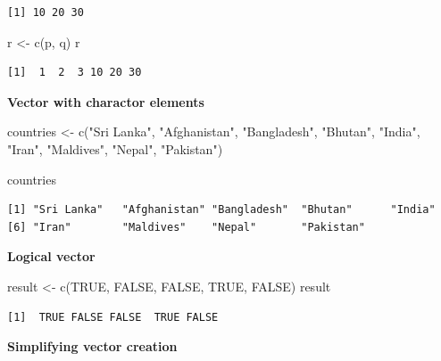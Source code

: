 \documentclass[
  letterpaper,
  DIV=11,
  numbers=noendperiod]{scrreprt}
\newenvironment{Shaded}{\begin{snugshade}}{\end{snugshade}}
\newcommand{\ConstantTok}[1]{\textcolor[rgb]{0.56,0.35,0.01}{#1}}
\newcommand{\FunctionTok}[1]{\textcolor[rgb]{0.28,0.35,0.67}{#1}}
\newcommand{\NormalTok}[1]{\textcolor[rgb]{0.00,0.23,0.31}{#1}}
\newcommand{\OtherTok}[1]{\textcolor[rgb]{0.00,0.23,0.31}{#1}}
\newcommand{\StringTok}[1]{\textcolor[rgb]{0.13,0.47,0.30}{#1}}
\begin{document}
\begin{verbatim}
[1] 10 20 30
\end{verbatim}

\begin{Shaded}
\begin{Highlighting}[]
\NormalTok{r }\OtherTok{\textless{}{-}} \FunctionTok{c}\NormalTok{(p, q)}
\NormalTok{r}
\end{Highlighting}
\end{Shaded}

\begin{verbatim}
[1]  1  2  3 10 20 30
\end{verbatim}

\textbf{Vector with charactor elements}

\begin{Shaded}
\begin{Highlighting}[]
\NormalTok{countries }\OtherTok{\textless{}{-}} \FunctionTok{c}\NormalTok{(}\StringTok{"Sri Lanka"}\NormalTok{, }\StringTok{"Afghanistan"}\NormalTok{, }\StringTok{"Bangladesh"}\NormalTok{, }\StringTok{"Bhutan"}\NormalTok{, }\StringTok{"India"}\NormalTok{, }\StringTok{"Iran"}\NormalTok{, }\StringTok{"Maldives"}\NormalTok{, }\StringTok{"Nepal"}\NormalTok{, }\StringTok{"Pakistan"}\NormalTok{)}

\NormalTok{countries}
\end{Highlighting}
\end{Shaded}

\begin{verbatim}
[1] "Sri Lanka"   "Afghanistan" "Bangladesh"  "Bhutan"      "India"      
[6] "Iran"        "Maldives"    "Nepal"       "Pakistan"   
\end{verbatim}

\textbf{Logical vector}

\begin{Shaded}
\begin{Highlighting}[]
\NormalTok{result }\OtherTok{\textless{}{-}} \FunctionTok{c}\NormalTok{(}\ConstantTok{TRUE}\NormalTok{, }\ConstantTok{FALSE}\NormalTok{, }\ConstantTok{FALSE}\NormalTok{, }\ConstantTok{TRUE}\NormalTok{, }\ConstantTok{FALSE}\NormalTok{)}
\NormalTok{result}
\end{Highlighting}
\end{Shaded}

\begin{verbatim}
[1]  TRUE FALSE FALSE  TRUE FALSE
\end{verbatim}

\textbf{Simplifying vector creation}
\end{document}
